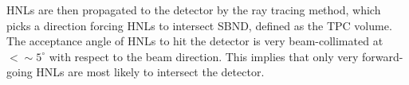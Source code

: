 HNLs are then propagated to the detector by the ray tracing method, which picks a direction forcing HNLs to intersect SBND, defined as the TPC volume.  
The acceptance angle of HNLs to hit the detector is very beam-collimated at $< \sim 5^\circ$ with respect to the beam direction.
This implies that only very forward-going HNLs are most likely to intersect the detector.

%

